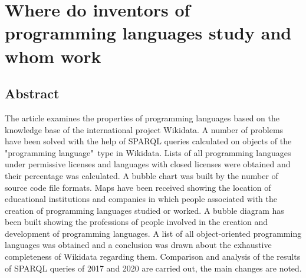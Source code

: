 \setchapterpreamble[u]{\margintoc}
\chapter{Where do inventors of programming languages ​​study and whom work}

\section{Abstract}
The article examines the properties of programming languages ​​based on the knowledge base of the international project Wikidata. A number of problems have been solved with the help of SPARQL queries calculated on objects of the "programming language"\  type in Wikidata. Lists of all programming languages ​​under permissive licenses and languages ​​with closed licenses were obtained and their percentage was calculated. A bubble chart was built by the number of source code file formats. Maps have been received showing the location of educational institutions and companies in which people associated with the creation of programming languages ​​studied or worked. A bubble diagram has been built showing the professions of people involved in the creation and development of programming languages. A list of all object-oriented programming languages ​​was obtained and a conclusion was drawn about the exhaustive completeness of Wikidata regarding them. Comparison and analysis of the results of SPARQL queries of 2017 and 2020 are carried out, the main changes are noted.

